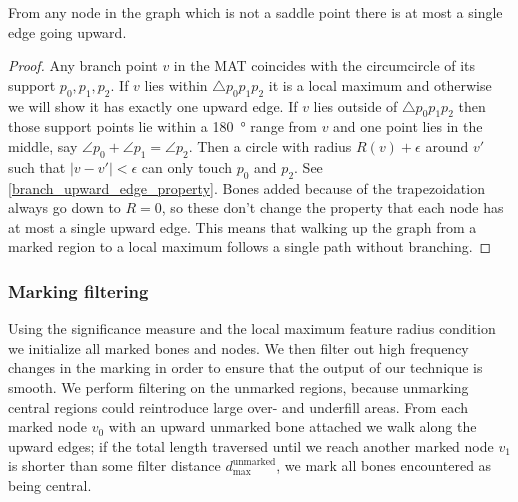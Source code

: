 \begin{lemma}\label{single_upward_edge}
From any node in the graph which is not a saddle point there is at most a single edge going upward.
\end{lemma}
\begin{proof}
Any branch point $v$ in the MAT coincides with the circumcircle of its support $p_0, p_1, p_2$.
If $v$ lies within $\triangle p_0 p_1 p_2$ it is a local maximum and otherwise we will show it has exactly one upward edge.
If $v$ lies outside of $\triangle p_0 p_1 p_2$ then those support points lie within a \SI{180}{\degree} range from $v$
and one point lies in the middle, say $\angle p_0 + \angle p_1 = \angle p_2$.
Then a circle with radius $R(v) + \epsilon$ around $v'$ such that $|v-v'| < \epsilon$ can only touch $p_0$ and $p_2$.
See \cref{branch_upward_edge_property}.
Bones added because of the trapezoidation always go down to $R=0$, so these don't change the property that each node has at most a single upward edge.
This means that walking up the graph from a marked region to a local maximum follows a single path without branching.
\end{proof}

\fi

\subsubsection{Marking filtering}
Using the significance measure and the local maximum feature radius condition we initialize all marked bones and nodes.
We then filter out high frequency changes in the marking in order to ensure that the output of our technique is smooth. 
We perform filtering on the unmarked regions, because unmarking central regions could reintroduce large over- and underfill areas.
From each marked node $v_0$ with an upward unmarked bone attached we walk along the upward edges;
if the total length traversed until we reach another marked node $v_1$ is shorter than some filter distance $d_\text{max}^\text{unmarked}$, we mark all bones encountered as being central.





